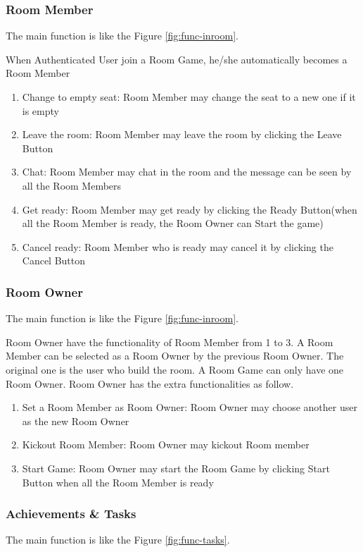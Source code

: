 \documentclass[11pt]{article}
\begin{document}
\subsubsection{Room Member}
The main function is like the Figure \ref{fig:func-inroom}.

When Authenticated User join a Room Game, he/she automatically becomes a Room Member
\begin{enumerate}
\item
Change to empty seat: Room Member may change the seat to a new one if it is empty
\item
Leave the room: Room Member may leave the room by clicking the Leave Button
\item
Chat: Room Member may chat in the room and the message can be seen by all the Room Members
\item
Get ready: Room Member may get ready by clicking the Ready Button(when all the Room Member is ready, the Room Owner can Start the game)
\item
Cancel ready: Room Member who is ready may cancel it by clicking the Cancel Button
\end{enumerate}

\subsubsection{Room Owner}
The main function is like the Figure \ref{fig:func-inroom}.

Room Owner have the functionality of Room Member from 1 to 3. A Room Member can be selected as a Room Owner by the previous Room Owner. The original one is the user who build the room. A Room Game can only have one Room Owner. Room Owner has the extra functionalities as follow.
\begin{enumerate}
\item
Set a Room Member as Room Owner: Room Owner may choose another user as the new Room Owner
\item
Kickout Room Member: Room Owner may kickout Room member
\item
Start Game: Room Owner may start the Room Game by clicking Start Button when all the Room Member is ready
\end{enumerate}

\subsubsection{Achievements \& Tasks}
The main function is like the Figure \ref{fig:func-tasks}.
\end{document}
